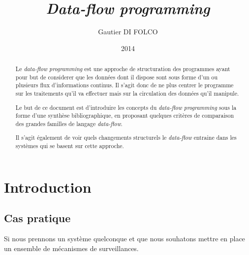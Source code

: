 \documentclass{article}
\title{\emph{Data-flow programming}}
\author{Gautier DI FOLCO}
\date{2014}
\begin{document}
\maketitle
\tableofcontents

\begin{abstract}
Le \emph{data-flow programming} est une approche de structuration des programmes
ayant pour but de considerer que les données dont il dispose sont sous forme
d'un ou plusieurs flux d'informations continus.
Il s'agit donc de ne plus centrer le programme sur les traitements qu'il va
effectuer mais sur la circulation des données qu'il manipule.

Le but de ce document est d'introduire les concepts du \emph{data-flow programming}
sous la forme d'une synthèse bibliographique, en proposant quelques critères de
comparaison des grandes familles de langage \emph{data-flow}.

Il s'agit également de voir quels changements structurels le \emph{data-flow}
entraine dans les systèmes qui se basent sur cette approche.
\end{abstract}




% 

\section{Introduction}\label{introduction}

\subsection{Cas pratique}
Si nous prennons un système quelconque et que nous souhatons mettre en place un
ensemble de mécanismes de surveillances.
\end{document}
